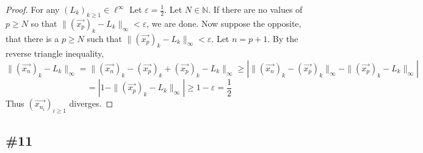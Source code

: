 \documentclass{article}
\theoremstyle{plain} %
\numberwithin{thm}{section} %
\theoremstyle{definition}
\begin{document}
\begin{enumerate}[label=(\alph*)]
\begin{proof}
                For any \((L_k)_{k\geq1} \in \ell^{\infty}\) Let \(\varepsilon = \frac{1}{2}\). Let \(N \in \mathbb{N}\). If there are no values of \(p \geq N\) so that \(\|(\vec{x_p})_k - L_{k}\| _\infty < \varepsilon\), we are done. Now suppose the opposite, that there is a \(p \geq N\) such that \(\|(\vec{x_{p}})_k - L_{k}\|_\infty < \varepsilon\). Let \(n = p + 1\). By the reverse triangle inequality,
                \[
                    \| (\vec{x_n})_k - L_k \|_\infty = \|(\vec{x_n})_k - (\vec{x_{p}})_k + (\vec{x_{p}})_k - L_k \| _\infty \geq \left|\|(\vec{x_n})_k - (\vec{x_{p}})_k \| _\infty - \|(\vec{x_{p}})_k - L_k \| _\infty \right| 
                \]
                \[
                    = \left| 1 - \|(\vec{x_{p}})_k - L_k \| _\infty \right| \geq  1 - \varepsilon = \frac{1}{2}
                \]
                Thus \((\vec{x_{n_i}})_{i\geq1}\) diverges.
    
            \end{proof}
        \end{enumerate}

        \subsection{\#11}
\end{document}
